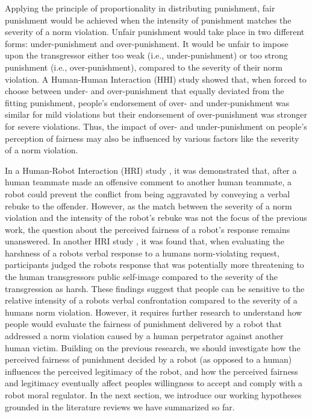 \documentclass{article} %
\begin{document}
Applying the principle of proportionality in distributing punishment, fair punishment would be achieved when the intensity of punishment matches the severity of a norm violation. Unfair punishment would take place in two different forms: under-punishment and over-punishment. It would be unfair to impose upon the transgressor either too weak (i.e., under-punishment) or too strong punishment (i.e., over-punishment), compared to the severity of their norm violation. A Human-Human Interaction (HHI) study \cite{wagstaff1997overpunishment} showed that, when forced to choose between under- and over-punishment that equally deviated from the fitting punishment, people's endorsement of over- and under-punishment was similar for mild violations but their endorsement of over-punishment was stronger for severe violations. Thus, the impact of over- and under-punishment on people's perception of fairness may also be influenced by various factors like the severity of a norm violation.

In a Human-Robot Interaction (HRI) study \cite{jung2015using}, it was demonstrated that, after a human teammate made an offensive comment to another human teammate, a robot could prevent the conflict from being aggravated by conveying a verbal rebuke to the offender. However, as the match between the severity of a norm violation and the intensity of the robot's rebuke was not the focus of the previous work, the question about the perceived fairness of a robot's response remains unanswered. In another HRI study \cite{jackson2019tact}, it was found that, when evaluating the harshness of a robots verbal response to a humans norm-violating request, participants judged the robots response that was potentially more threatening to the human transgressors public self-image compared to the severity of the transgression as harsh. These findings suggest that people can be sensitive to the relative intensity of a robots verbal confrontation compared to the severity of a humans norm violation. However, it requires further research to understand how people would evaluate the fairness of punishment delivered by a robot that addressed a norm violation caused by a human perpetrator against another human victim. Building on the previous research, we should investigate how the perceived fairness of punishment decided by a robot (as opposed to a human) influences the perceived legitimacy of the robot, and how the perceived fairness and legitimacy eventually affect peoples willingness to accept and comply with a robot moral regulator. In the next section, we introduce our working hypotheses grounded in the literature reviews we have summarized so far. 
\end{document}
